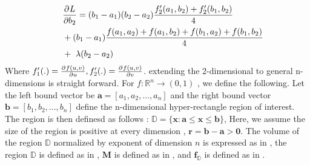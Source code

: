 \begin{equation}
\begin{aligned} 
~~~~&\frac{\partial^{} L}{\partial b_{2}} = (b_{1}-a_{1})(b_{2}-a_{2})\frac{f^{\prime}_{2}(a_{1},b_{2}) + f^{\prime}_{2}(b_{1},b_{2})}{4}\\ &+(b_{1} - a_{1})\frac{f(a_{1},a_{2}) + f(a_{1},b_{2}) + f(b_{1},a_{2}) + f(b_{1},b_{2}) }{4}  \\ &+~ \lambda (b_2-a_2)
\label{eq:update-trap-2-4}
\end{aligned}
\end{equation}
Where $f^{\prime}_{1}(.) = \frac{\partial^{} f(u,v)}{\partial u}, f^{\prime}_{2}(.) = \frac{\partial^{} f(u,v)}{\partial v}$.
extending the 2-dimensional to general n-dimensions is straight forward. For $f: \mathbb{R}^{n} \rightarrow (0,1)$  , we define the following. Let the left bound vector be $\mathbf{a} = [a_{1},a_{2},...,a_{n}]$ and the right bound vector $\mathbf{b} = [b_{1},b_{2},...,b_{n}]$ define the n-dimensional hyper-rectangle region of interest. The region is then definesd as follows : $\mathbb{D} = \{\mathbf{x}: \mathbf{a} \leq \mathbf{x} \leq \mathbf{b}\}$, Here, we assume the size of the region is positive at every dimension , \ie $\mathbf{r} =  \mathbf{b} -  \mathbf{a} > \mathbf{0} $. The volume of the region $\mathbb{D}$ normalized by exponent of dimension $n$ is expressed as in \eqLabel{\ref{eq:n-vol-sup}}, the region  $\mathbb{D}$ is defined as in \eqLabel{\ref{eq:n-corners-sup}}, $\mathbf{M}$ is defined as in \eqLabel{\ref{eq:n-mask-sup}}, and $\mathbf{f}_{\mathbb{D}}$ is defined as in \eqLabel{\ref{eq:n-function-sup}}.
